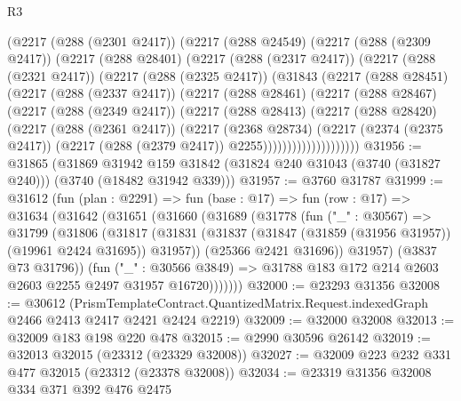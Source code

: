\begin{lexlean}{R3}
\begin{coremodule}
      (@2217
        (@288 (@2301 @2417))
        (@2217
          (@288 @24549)
          (@2217
            (@288 (@2309 @2417))
            (@2217
              (@288 @28401)
              (@2217
                (@288 (@2317 @2417))
                (@2217
                  (@288 (@2321 @2417))
                  (@2217
                    (@288 (@2325 @2417))
                    (@31843
                      (@2217
                        (@288 @28451)
                        (@2217
                          (@288 (@2337 @2417))
                          (@2217
                            (@288 @28461)
                            (@2217
                              (@288 @28467)
                              (@2217
                                (@288 (@2349 @2417))
                                (@2217
                                  (@288 @28413)
                                  (@2217
                                    (@288 @28420)
                                    (@2217
                                      (@288 (@2361 @2417))
                                      (@2217
                                        (@2368 @28734)
                                        (@2217
                                          (@2374 (@2375 @2417))
                                          (@2217 (@288 (@2379 @2417)) @2255))))))))))))))))))))
@31956 := @31865
    (@31869
      @31942
      @159
      @31842
      (@31824 @240 @31043 (@3740 (@31827 @240)))
      (@3740 (@18482 @31942 @339)))
@31957 := @3760 @31787
@31999 := @31612
    (fun (plan : @2291) =>
    fun (base : @17) =>
    fun (row : @17) =>
    @31634
      (@31642
        (@31651
          (@31660
            (@31689
              (@31778
                (fun ("_" : @30567) =>
                @31799
                  (@31806
                    (@31817
                      (@31831
                        (@31837 (@31847 (@31859 (@31956 @31957)) (@19961 @2424 @31695)) @31957))
                      (@25366 @2421 @31696))
                    @31957)
                  (@3837 @73 @31796))
                (fun ("_" : @30566 @3849) =>
                @31788 @183 @172 @214 @2603 @2603 @2255 @2497 @31957 @16720)))))))
@32000 := @23293 @31356
@32008 := @30612
    (PrismTemplateContract.QuantizedMatrix.Request.indexedGraph @2466 @2413 @2417 @2421 @2424 @2219)
@32009 := @32000 @32008
@32013 := @32009 @183 @198 @220 @478
@32015 := @2990 @30596 @26142
@32019 := @32013 @32015 (@23312 (@23329 @32008))
@32027 := @32009 @223 @232 @331 @477 @32015 (@23312 (@23378 @32008))
@32034 := @23319 @31356 @32008 @334 @371 @392 @476 @2475

\end{coremodule}
\end{lexlean}
